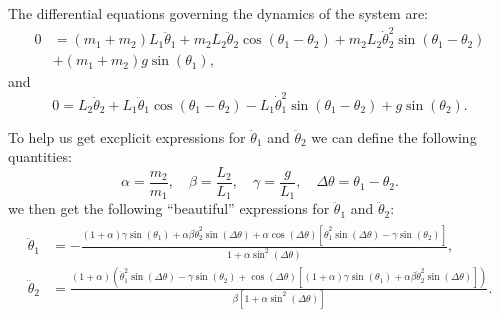 The differential equations governing the dynamics of the system are:
\begin{equation}
	\begin{aligned}
		0 & = \left(m_{1}+m_{2}\right)L_{1}\ddot{\theta}_{1} + m_{2}L_{2}\ddot{\theta}_{2}\cos\left(\theta_{1}-\theta_{2}\right) + m_{2}L_{2}\dot{\theta}_{2}^{2}\sin\left(\theta_{1}-\theta_{2}\right) \\
		  & + \left(m_{1}+m_{2}\right)g\sin\left(\theta_{1}\right),
	\end{aligned}
\end{equation}
and
\begin{equation}
	0 = L_{2}\ddot{\theta}_{2}+L_{1}\ddot{\theta}_{1}\cos\left(\theta_{1}-\theta_{2}\right) - L_{1}\dot{\theta}_{1}^{2}\sin\left(\theta_{1}-\theta_{2}\right) + g\sin\left(\theta_{2}\right).
\end{equation}

To help us get excplicit expressions for $\ddot{\theta}_{1}$ and $\ddot{\theta}_{2}$ we can define the following quantities:
\begin{equation}
	\alpha = \frac{m_{2}}{m_{1}},\quad \beta = \frac{L_{2}}{L_{1}},\quad \gamma = \frac{g}{L_{1}},\quad \Delta\theta = \theta_{1}-\theta_{2}.
	\label{eq:double_pendulum_helper_defs}
\end{equation}
we then get the following \enquote{beautiful} expressions for $\ddot{\theta}_{1}$ and $\ddot{\theta}_{2}$:
\begin{align}
	\begin{split}
		\ddot{\theta}_{1} & = -\frac{\left(1+\alpha\right)\gamma\sin\left(\theta_{1}\right) + \alpha\beta\dot{\theta}_{2}^{2}\sin(\Delta\theta)+\alpha\cos\left(\Delta\theta\right)\left[\dot{\theta}_{1}^{2}\sin\left(\Delta\theta\right)-\gamma\sin\left(\theta_{2}\right)\right]}{1+\alpha\sin^{2}\left(\Delta\theta\right)},                                                       \\
		\ddot{\theta}_{2} & = \frac{\left(1+\alpha\right)\left(\dot{\theta}_{1}^{2}\sin\left(\Delta\theta\right)-\gamma\sin\left(\theta_{2}\right)+\cos\left(\Delta\theta\right)\left[\left(1+\alpha\right)\gamma\sin\left(\theta_{1}\right)+\alpha\beta\dot{\theta}^{2}_{2}\sin\left(\Delta\theta\right)\right]\right)}{\beta\left[1+\alpha\sin^{2}\left(\Delta\theta\right)\right]}.
	\end{split}
	\label{eq:double_pendulum_accelerations}
\end{align}

